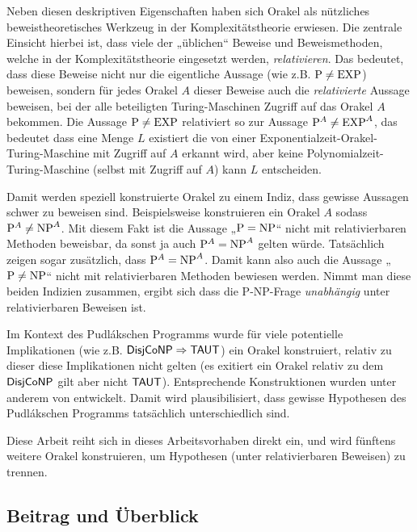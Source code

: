 Neben diesen deskriptiven Eigenschaften haben sich Orakel als nützliches beweistheoretisches Werkzeug in der Komplexitätstheorie erwiesen. Die zentrale Einsicht hierbei ist, dass viele der „üblichen“ Beweise und Beweismethoden, welche in der Komplexitätstheorie eingesetzt werden, \emph{relativieren}. Das bedeutet, dass diese Beweise nicht nur die eigentliche Aussage (wie z.B. $\P\neq \mathrm{EXP}$) beweisen, sondern für jedes Orakel $A$ dieser Beweise auch die \emph{relativierte} Aussage beweisen, bei der  alle beteiligten Turing-Maschinen Zugriff auf das Orakel $A$ bekommen. Die Aussage $\P\neq \mathrm{EXP}$ relativiert so zur Aussage $\P^A\neq \mathrm{EXP}^A$, das bedeutet dass eine Menge $L$ existiert die von einer Exponentialzeit-Orakel-Turing-Maschine mit Zugriff auf $A$ erkannt wird, aber keine Polynomialzeit-Turing-Maschine (selbst mit Zugriff auf $A$) kann $L$ entscheiden.

Damit werden speziell konstruierte Orakel zu einem Indiz, dass gewisse Aussagen schwer zu beweisen sind.
Beispielsweise konstruieren \textcite{baker_relativizations_1975} ein Orakel $A$ sodass $\P^A\neq \NP^A$. Mit diesem Fakt ist die Aussage „$\P=\NP$“ nicht mit relativierbaren Methoden beweisbar, da sonst ja auch $\P^A=\NP^A$ gelten würde. Tatsächlich zeigen \citeauthor{baker_relativizations_1975} sogar zusätzlich, dass $\P^A= \NP^A$. Damit kann also auch die Aussage „$\P\neq\NP$“ nicht mit relativierbaren Methoden bewiesen werden. Nimmt man diese beiden Indizien zusammen, ergibt sich dass die P-NP-Frage \emph{unabhängig} unter relativierbaren Beweisen ist.

Im Kontext des Pudlákschen Programms wurde für viele potentielle Implikationen (wie z.B. $\hDisjCoNP\Rightarrow\hTAUT$) ein Orakel konstruiert, relativ zu dieser diese Implikationen nicht gelten (es exitiert ein Orakel relativ zu dem $\hDisjCoNP$ gilt aber nicht $\hTAUT$). Entsprechende Konstruktionen wurden unter anderem von \textcites{glaser_disjoint_2004}{dose_np-completeness_2019}{dose_balance_2020}{dose_further_2020}{dingel_separation_2022}{ehrmanntraut_oracle_2022}{khaniki_new_2022} entwickelt. Damit wird plausibilisiert, dass gewisse Hypothesen des Pudlákschen Programms tatsächlich unterschiedlich sind.

Diese Arbeit reiht sich in dieses Arbeitsvorhaben direkt ein, und wird fünftens weitere Orakel konstruieren, um Hypothesen (unter relativierbaren Beweisen) zu trennen.

\subsection*{Beitrag und Überblick}

